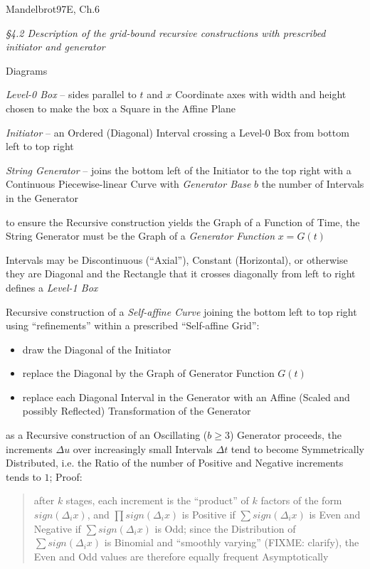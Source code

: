 Mandelbrot97E, Ch.6

\emph{\S 4.2 Description of the grid-bound recursive constructions with
  prescribed initiator and generator}

Diagrams

\emph{Level-0 Box} -- sides parallel to $t$ and $x$ Coordinate axes with width
and height chosen to make the box a Square in the Affine Plane

\emph{Initiator} -- an Ordered (Diagonal) Interval crossing a Level-0 Box
from bottom left to top right

\emph{String Generator} -- joins the bottom left of the Initiator to the top
right with a Continuous Piecewise-linear Curve with \emph{Generator Base} $b$
the number of Intervals in the Generator

to ensure the Recursive construction yields the Graph of a Function of Time, the
String Generator must be the Graph of a \emph{Generator Function} $x = G(t)$

Intervals may be Discontinuous (``Axial''), Constant (Horizontal), or otherwise
they are Diagonal and the Rectangle that it crosses diagonally from left to
right defines a \emph{Level-1 Box}

Recursive construction of a \emph{Self-affine Curve} joining the bottom left to
top right using ``refinements'' within a prescribed ``Self-affine Grid'':
\begin{itemize}
  \item draw the Diagonal of the Initiator
  \item replace the Diagonal by the Graph of Generator Function $G(t)$
  \item replace each Diagonal Interval in the Generator with an Affine (Scaled
    and possibly Reflected) Transformation of the Generator
\end{itemize}

as a Recursive construction of an Oscillating ($b \geq 3$) Generator proceeds,
the increments $\Delta u$ over increasingly small Intervals $\Delta t$ tend to
become Symmetrically Distributed, i.e. the Ratio of the number of Positive and
Negative increments tends to $1$; Proof:
\begin{quote}
  after $k$ stages, each increment is the ``product'' of $k$ factors of the form
  $sign(\Delta_i x)$, and $\prod sign(\Delta_i x)$ is Positive if
  $\sum sign(\Delta_i x)$ is Even and Negative if $\sum sign(\Delta_i x)$ is
  Odd; since the Distribution of $\sum sign(\Delta_i x)$ is Binomial and
  ``smoothly varying'' (FIXME: clarify), the Even and Odd values are therefore
  equally frequent Asymptotically
\end{quote}

